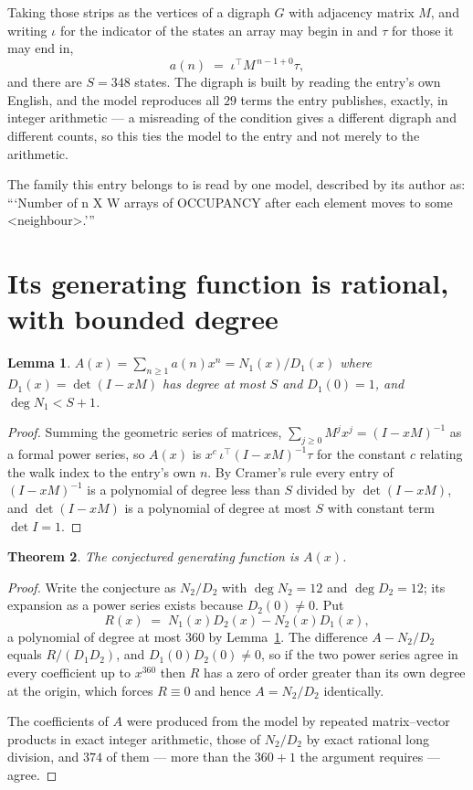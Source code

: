 \documentclass[11pt,a4paper]{article}
\theoremstyle{plain}
\newtheorem{theorem}{Theorem}
\newtheorem{lemma}[theorem]{Lemma}
\theoremstyle{definition}
\begin{document}
Taking those strips as the vertices of a digraph $G$ with adjacency matrix $M$, and writing
$\iota$ for the indicator of the states an array may begin in and $\tau$ for those it may end
in,
\[
a(n)\;=\;\iota^{\!\top}M^{\,n-1+0}\tau ,
\]
and there are $S=348$ states. The digraph is built by reading the entry's own English, and the
model reproduces all $29$ terms the entry publishes, exactly, in integer arithmetic --- a
misreading of the condition gives a different digraph and different counts, so this ties the
model to the entry and not merely to the arithmetic.

The family this entry belongs to is read by one model, described by its author as: ```Number of n X W arrays of OCCUPANCY after each element moves to some <neighbour>.'''


\section{Its generating function is rational, with bounded degree}

\begin{lemma}\label{lem:rat}
$A(x)=\sum_{n\ge1}a(n)x^n=N_1(x)/D_1(x)$ where $D_1(x)=\det(I-xM)$ has degree at most
$S$ and $D_1(0)=1$, and $\deg N_1<S+1$.
\end{lemma}

\begin{proof}
Summing the geometric series of matrices, $\sum_{j\ge0}M^jx^j=(I-xM)^{-1}$ as a formal
power series, so $A(x)$ is $x^{c}\,\iota^{\!\top}(I-xM)^{-1}\tau$ for the constant $c$
relating the walk index to the entry's own $n$. By Cramer's rule every entry of
$(I-xM)^{-1}$ is a polynomial of degree less than $S$ divided by $\det(I-xM)$, and
$\det(I-xM)$ is a polynomial of degree at most $S$ with constant term $\det I=1$.
\end{proof}

\begin{theorem}
The conjectured generating function is $A(x)$.
\end{theorem}

\begin{proof}
Write the conjecture as $N_2/D_2$ with $\deg N_2=12$ and $\deg D_2=12$; its expansion as a
power series exists because $D_2(0)\neq0$. Put
\[
R(x)\;=\;N_1(x)D_2(x)-N_2(x)D_1(x),
\]
a polynomial of degree at most $360$ by Lemma~\ref{lem:rat}. The difference
$A-N_2/D_2$ equals $R/(D_1D_2)$, and $D_1(0)D_2(0)\neq0$, so if the two power series agree in
every coefficient up to $x^{360}$ then $R$ has a zero of order greater than its own
degree at the origin, which forces $R\equiv0$ and hence $A=N_2/D_2$ identically.

The coefficients of $A$ were produced from the model by repeated matrix--vector products in
exact integer arithmetic, those of $N_2/D_2$ by exact rational long division, and $374$
of them --- more than the $360+1$ the argument requires --- agree.
\end{proof}
\end{document}
